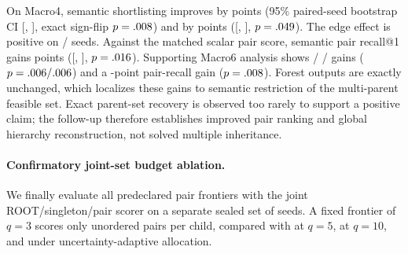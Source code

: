 On Macro4, semantic shortlisting improves \ef{} by
\PairMacroFourEdgeDelta{} points (95\% paired-seed bootstrap CI
[\PairMacroFourEdgeLow, \PairMacroFourEdgeHigh], exact sign-flip
$p=.008$) and \af{} by \PairMacroFourAncestorDelta{} points
([\PairMacroFourAncestorLow, \PairMacroFourAncestorHigh],
$p=.049$).  The edge effect is positive on
\PairMacroFourEdgeWins/\PairSeeds{} seeds.  Against the matched scalar pair
score, semantic pair recall@1 gains \PairMacroFourPairRecallDelta{} points
([\PairMacroFourPairRecallLow, \PairMacroFourPairRecallHigh],
$p=.016$).  Supporting Macro6 analysis shows
\PairMacroSixEdgeDelta/\PairMacroSixAncestorDelta{} \ef/\af{} gains
($p=.006/.006$) and a
\PairMacroSixPairRecallDelta-point pair-recall gain
($p=.008$).  Forest outputs are exactly unchanged, which
localizes these gains to semantic restriction of the multi-parent feasible
set.  Exact parent-set recovery is observed too rarely to support a positive
claim; the follow-up therefore establishes improved pair ranking and global
hierarchy reconstruction, not solved multiple inheritance.

\paragraph{Confirmatory joint-set budget ablation.}
We finally evaluate all predeclared pair frontiers with the joint
ROOT/singleton/pair scorer on a separate sealed set of
\JointSetSeeds{} seeds. A fixed frontier of $q=3$ scores only
\JointQThreePairs{} unordered pairs per child, compared with
\JointQFivePairs{} at $q=5$, \JointQTenPairs{} at $q=10$, and
\JointAdaptivePairs{} under uncertainty-adaptive allocation.

